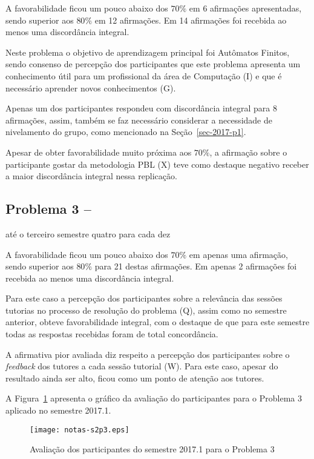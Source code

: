 A favorabilidade ficou um pouco abaixo dos $70\%$ em 6 afirmações apresentadas,
sendo superior aos $80\%$ em 12 afirmações.
Em 14 afirmações foi recebida ao menos uma discordância integral.

Neste problema o objetivo de aprendizagem principal foi
Autômatos Finitos, sendo consenso de percepção dos participantes que
este problema apresenta um conhecimento útil para um profissional
da área de Computação (I) e que é necessário aprender novos
conhecimentos (G).

Apenas um dos participantes respondeu com discordância integral para
8 afirmações, assim, também se faz necessário considerar a
necessidade de nivelamento do grupo, como mencionado
na Seção~\ref{sec-2017-p1}.

Apesar de obter favorabilidade muito próxima aos $70\%$, a afirmação
sobre o participante gostar da metodologia PBL (X) teve como
destaque negativo receber a maior discordância integral nessa
replicação.


\subsection{Problema 3 -- \ProblemaC}
{até o terceiro semestre}{ quatro para cada dez}

A favorabilidade ficou um pouco abaixo dos $70\%$ em apenas uma afirmação,
sendo superior aos $80\%$ para 21 destas afirmações.
Em apenas 2 afirmações foi recebida ao menos uma discordância integral.

Para este caso a percepção dos participantes
sobre a relevância das sessões tutorias no processo
de resolução do problema (Q), assim como no semestre
anterior, obteve favorabilidade integral, com o destaque de
que para este semestre todas as respostas recebidas foram de
total concordância.

A afirmativa pior avaliada diz respeito a percepção dos participantes
sobre o \textit{feedback} dos tutores a cada sessão tutorial (W).
Para este caso, apesar do resultado ainda ser alto, ficou como
um ponto de atenção aos tutores.

A Figura~\ref{aval-s2p3} apresenta o gráfico da
avaliação do participantes para o Problema 3 aplicado no semestre 2017.1.

\begin{figure}[!htb]
\centering
\texttt{[image: notas-s2p3.eps]}
\caption{Avaliação dos participantes do semestre 2017.1 para o Problema 3}
\label{aval-s2p3}
\end{figure}

